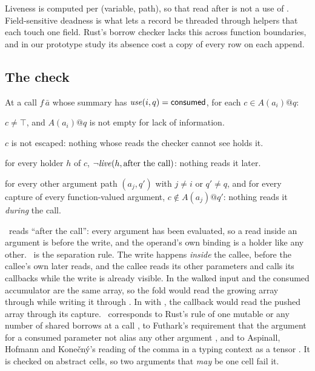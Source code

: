 Liveness is computed per (variable, path), so that  read after
 is not a use of . Field-sensitive deadness is what lets a
record be threaded through helpers that each touch one field. Rust's borrow checker lacks this
across function boundaries, and in our prototype study its absence cost a copy of every row on each
append.

\subsection{The check}
\label{sec:model-check}

At a call $f\,\bar a$ whose summary has $\mathit{use}(i, q) = \mathsf{consumed}$, for each $c \in A(a_i)@q$:

\begin{description}[leftmargin=1.2em,font=\normalfont]
\item[\Known] $c \neq \top$, and $A(a_i)@q$ is not empty for lack of information.
\item[\Unescaped] $c$ is not escaped: nothing whose reads the checker cannot see holds it.
\item[\Dead] for every holder $h$ of $c$, $\neg\mathit{live}(h, \text{after the call})$: nothing reads it later.
\item[\Disjoint] for every other argument path $(a_j, q')$ with $j \neq i$ or $q' \neq q$, and for every
capture of every function-valued argument, $c \notin A(a_j)@q'$: nothing reads it \emph{during} the call.
\end{description}

\Dead\ reads ``after the call'': every argument has been evaluated, so a read inside an argument is
before the write, and the operand's own binding is a holder like any other. \Disjoint\ is the
separation rule. The write happens \emph{inside} the callee, before the callee's own later reads,
and the callee reads its other parameters and calls its callbacks while the write is already visible.
In  the walked input and the consumed
accumulator are the same array, so the fold would read the growing array through  while
writing it through . In  with
, the callback would read the pushed array through its capture.
\Disjoint\ corresponds to Rust's rule of one mutable or any number of shared borrows at a call
\citep{rfc2094}, to Futhark's requirement that the argument for a consumed parameter not alias any
other argument \citep{henriksen2017thesis}, and to Aspinall, Hofmann and Kone\v{c}n\'y's reading of the
comma in a typing context as a tensor \citep[\S3]{aspinall2008usage}. It is checked on abstract
cells, so two arguments that \emph{may} be one cell fail it.

